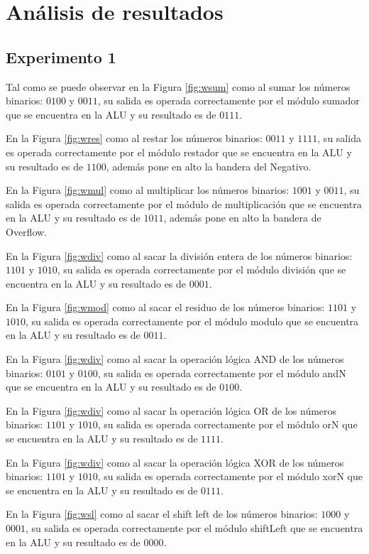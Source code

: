 \documentclass[journal]{IEEEtran}
\begin{document}
	\section{Análisis de resultados} 
	
	\subsection {Experimento 1}
	Tal como se puede observar en la Figura \ref{fig:wsum} como al sumar los números binarios: $0100$ y $0011$, su salida es operada correctamente por el módulo sumador que se encuentra en la ALU y su resultado es de $0111$.
	
	En la Figura \ref{fig:wres} como al restar los números binarios: $0011$ y $1111$, su salida es operada correctamente por el módulo restador que se encuentra en la ALU y su resultado es de $1100$, además pone en alto la bandera del Negativo. 
	
	En la Figura \ref{fig:wmul} como al multiplicar los números binarios: $1001$ y $0011$, su salida es operada correctamente por el módulo de multiplicación que se encuentra en la ALU y su resultado es de $1011$, además pone en alto la bandera de Overflow.
	
	En la Figura \ref{fig:wdiv} como al sacar la división entera de los números binarios: $1101$ y $1010$, su salida es operada correctamente por el módulo división que se encuentra en la ALU y su resultado es de $0001$.
	
	En la Figura \ref{fig:wmod} como al sacar el residuo de los números binarios: $1101$ y $1010$, su salida es operada correctamente por el módulo modulo que se encuentra en la ALU y su resultado es de $0011$.
	
	En la Figura \ref{fig:wdiv} como al sacar la operación lógica AND de los números binarios: $0101$ y $0100$, su salida es operada correctamente por el módulo andN que se encuentra en la ALU y su resultado es de $0100$.
	
	En la Figura \ref{fig:wdiv} como al sacar la operación lógica OR de los números binarios: $1101$ y $1010$, su salida es operada correctamente por el módulo orN que se encuentra en la ALU y su resultado es de $1111$.
	
	En la Figura \ref{fig:wdiv} como al sacar la operación lógica XOR de los números binarios: $1101$ y $1010$, su salida es operada correctamente por el módulo xorN que se encuentra en la ALU y su resultado es de $0111$.
	
	En la Figura \ref{fig:wsl} como al sacar el shift left de los números binarios: $1000$ y $0001$, su salida es operada correctamente por el módulo shiftLeft que se encuentra en la ALU y su resultado es de $0000$.
	
\end{document}

